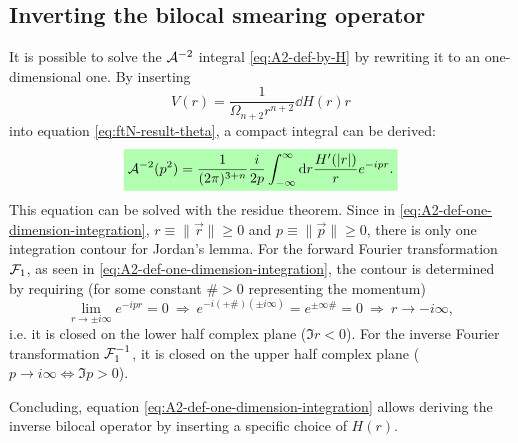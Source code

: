 \documentclass[12pt,a4paper]{report}
\numberwithin{equation}{chapter}
\newcommand{\highlight}[1]{%
  \colorbox{green!30}{$\displaystyle#1$}}
\begin{document}
\subsection{Inverting the bilocal smearing operator}
It is possible to solve the ${\cal A}^{-2}$ integral \eqref{eq:A2-def-by-H} by rewriting it to an one-dimensional one. By inserting
\begin{equation} \label{eq:generic-bigV}
V(r) = \frac{1}{\Omega_{n+2} r^{n+2}} \dd{H(r)}{r}
\end{equation}
into equation \eqref{eq:ftN-result-theta}, a compact integral can be derived:
\begin{equation} \label{eq:A2-def-one-dimension-integration}
\highlight{
\C A^{-2}(p^2) =
\frac{1}{(2\pi)^{3+n}} \frac{i}{2p}
\int_{-\infty}^\infty \d r \frac{H'(|r|)}r e^{-ipr}.
}%
\end{equation}
This equation can be solved with the residue theorem. Since in \eqref{eq:A2-def-one-dimension-integration}, $r\equiv\|\vec r\| \geq 0$ and $p\equiv \|\vec p\| \geq 0$, there is only one integration contour for Jordan's lemma. For the forward Fourier transformation ${\cal F}_1$, as seen in \eqref{eq:A2-def-one-dimension-integration}, the contour is determined by requiring (for some constant $\# > 0$ representing the momentum)
\begin{equation} \label{eq:jordan}
\lim_{r\to \pm i \infty} e^{-ipr} = 0
~\Rightarrow~
e^{-i (+\#) (\pm i\infty)} = e^{\pm \infty \#} = 0
~\Rightarrow~
r \to -i\infty,
\end{equation}
i.e. it is closed on the lower half complex plane ($\Im r < 0$). For the inverse Fourier transformation ${\cal F}_1^{-1}$, it is closed on the upper half complex plane ($p \to i\infty \Leftrightarrow \Im p > 0$). 

Concluding, equation \eqref{eq:A2-def-one-dimension-integration} allows deriving the inverse bilocal operator by inserting a specific choice of $H(r)$.
\end{document}
